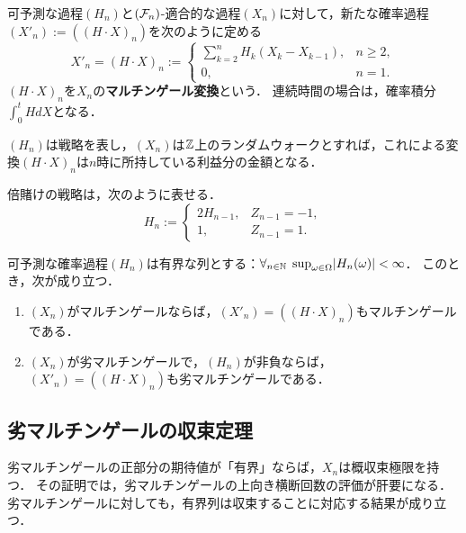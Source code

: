 \documentclass[uplatex,dvipdfmx]{jsreport}
\begin{document}
\begin{definition}
    可予測な過程$(H_n)$と$(\mathcal{F}_n)$-適合的な過程$(X_n)$に対して，新たな確率過程$(X'_n):=((H\cdot X)_n)$を次のように定める
    \[X'_n=(H\cdot X)_n:=\begin{cases}
        \sum^n_{k=2}H_k(X_k-X_{k-1}),&n\ge 2,\\
        0,&n=1.
    \end{cases}\]
    $(H\cdot X)_n$を$X_n$の\textbf{マルチンゲール変換}という．
    連続時間の場合は，確率積分$\int^t_0HdX$となる．
\end{definition}
\begin{remarks}
    $(H_n)$は戦略を表し，$(X_n)$は$\mathbb{Z}$上のランダムウォークとすれば，これによる変換$(H\cdot X)_n$は$n$時に所持している利益分の金額となる．
\end{remarks}

\begin{example}
    倍賭けの戦略は，次のように表せる．
    \[H_n:=\begin{cases}
        2H_{n-1},&Z_{n-1}=-1,\\
        1,&Z_{n-1}=1.
    \end{cases}\]
\end{example}

\begin{theorem}
    可予測な確率過程$(H_n)$は有界な列とする：$\forall_{n\in\mathbb{N}}\;\sup_{\omega\in\Omega}\lvert H_n(\omega)\rvert<\infty$．
    このとき，次が成り立つ．
    \begin{enumerate}
        \item $(X_n)$がマルチンゲールならば，$(X'_n)=((H\cdot X)_n)$もマルチンゲールである．
        \item $(X_n)$が劣マルチンゲールで，$(H_n)$が非負ならば，$(X'_n)=((H\cdot X)_n)$も劣マルチンゲールである．
    \end{enumerate}
\end{theorem}

\subsection{劣マルチンゲールの収束定理}

\begin{tcolorbox}[colframe=ForestGreen, colback=ForestGreen!10!white,breakable,colbacktitle=ForestGreen!40!white,coltitle=black,fonttitle=\bfseries\sffamily,
title=]
    劣マルチンゲールの正部分の期待値が「有界」ならば，$X_n$は概収束極限を持つ．
    その証明では，劣マルチンゲールの上向き横断回数の評価が肝要になる．
    劣マルチンゲールに対しても，有界列は収束することに対応する結果が成り立つ．
\end{tcolorbox}
\end{document}
